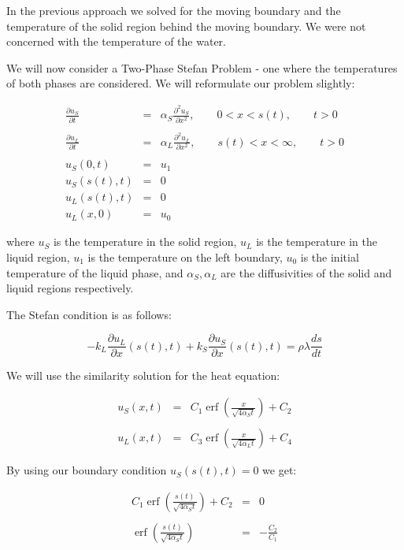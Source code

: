 \documentclass{report}
\DeclareMathOperator{\erf}{erf}
\begin{document}
In the previous approach we solved for the moving boundary and the temperature of the solid region behind 
the moving boundary. We were not concerned with the temperature of the water.\bigskip

We will now consider a Two-Phase Stefan Problem - one where the temperatures of both phases are considered. 
We will reformulate our problem slightly:\bigskip

\begin{eqnarray*} 
  \frac{\partial u_S}{\partial t} & = & \alpha_S \frac{\partial^2 u_S}{\partial x^2}, \qquad 0 < x < s(t), \qquad t > 0 \\\\
  \frac{\partial u_L}{\partial t} & = & \alpha_L \frac{\partial^2 u_L}{\partial x^2}, \qquad s(t) < x < \infty, \qquad t > 0 \\\\
                        u_S(0, t) & = & u_1 \\
                     u_S(s(t), t) & = & 0 \\
                     u_L(s(t), t) & = & 0 \\
                        u_L(x, 0) & = & u_0 
\end{eqnarray*}\medskip

where $u_S$ is the temperature in the solid region, $u_L$ is the temperature in the liquid region, $u_1$ is 
the temperature on the left boundary, $u_0$ is the initial temperature of the liquid phase, and $\alpha_S, 
\alpha_L$ are the diffusivities of the solid and liquid regions respectively.\bigskip

The Stefan condition is as follows:\bigskip

\[
  -k_L \frac{\partial u_L}{\partial x} (s(t), t) + k_S \frac{\partial u_S}{\partial x} (s(t), t) = \rho \lambda \frac{d s}{d t} 
\]\medskip

We will use the similarity solution for the heat equation:\bigskip

\begin{eqnarray*}  
  u_S(x, t) & = & C_1 \erf \left( \frac{x}{\sqrt{4 \alpha_S t}} \right) + C_2 \\\\
  u_L(x, t) & = & C_3 \erf \left( \frac{x}{\sqrt{4 \alpha_L t}} \right) + C_4
\end{eqnarray*}\medskip

By using our boundary condition $u_S(s(t), t) = 0$ we get:\bigskip

\begin{eqnarray*}
  C_1 \erf \left( \frac{s(t)}{\sqrt{4 \alpha_S t}} \right) + C_2 & = & 0 \\\\
            \erf \left( \frac{s(t)}{\sqrt{4 \alpha_S t}} \right) & = & - \frac{C_2}{C_1}
\end{eqnarray*}\medskip
\end{document}
